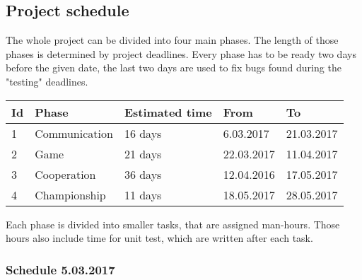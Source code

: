 \documentclass[11pt,a4paper]{article}
\begin{document}
\subsection{Project schedule}

The whole project can be divided into four main phases. The length of those phases is determined by project deadlines. Every phase has to be ready two days before the given date, the last two days are used to fix bugs found during the "testing" deadlines. \\

\begin{longtable}{| p{1cm} | p{4cm} | p{3cm} | l | l |}
\hline
\textbf{Id} & \textbf{Phase} & \textbf{Estimated time} & \textbf{From} & \textbf{To} \\ \hline
1 & Communication & 16 days & 6.03.2017 & 21.03.2017 \\ \hline
2 & Game & 21 days & 22.03.2017 & 11.04.2017 \\ \hline
3 & Cooperation & 36 days & 12.04.2016 & 17.05.2017 \\ \hline
4 & Championship & 11 days & 18.05.2017 & 28.05.2017 \\ \hline
\end{longtable}

Each phase is divided into smaller tasks, that are assigned man-hours. Those hours also include time for unit test, which are written after each task.

\subsubsection{Schedule 5.03.2017}
\end{document}
